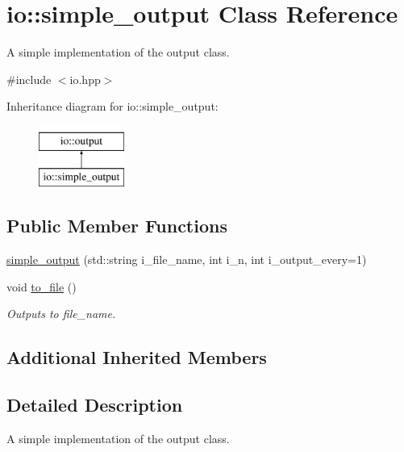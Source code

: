 \hypertarget{classio_1_1simple__output}{\section{io\-:\-:simple\-\_\-output Class Reference}
\label{classio_1_1simple__output}
}


A simple implementation of the output class.  




{\ttfamily \#include $<$io.\-hpp$>$}

Inheritance diagram for io\-:\-:simple\-\_\-output\-:\begin{figure}[H]
\begin{center}
\leavevmode
\includegraphics[height=2.000000cm]{classio_1_1simple__output}
\end{center}
\end{figure}
\subsection*{Public Member Functions}
\begin{DoxyCompactItemize}
\item 
\hyperlink{classio_1_1simple__output_a7b4c7960b14193d6bd7756c1c9f0f3b4}{simple\-\_\-output} (std\-::string i\-\_\-file\-\_\-name, int i\-\_\-n, int i\-\_\-output\-\_\-every=1)
\item 
void \hyperlink{classio_1_1simple__output_ab0af023314775f6e9e3bf08ee3cc83f9}{to\-\_\-file} ()
\begin{DoxyCompactList}\small\item\em Outputs to file\-\_\-name. \end{DoxyCompactList}\end{DoxyCompactItemize}
\subsection*{Additional Inherited Members}


\subsection{Detailed Description}
A simple implementation of the output class. 



